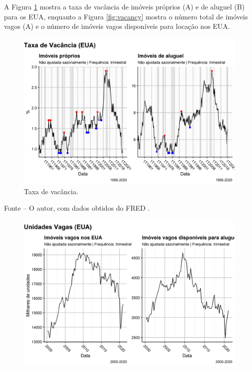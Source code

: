 \documentclass[
	12pt,				%
	oneside,			%
	a4paper,			%
	chapter=TITLE,		%
	section=TITLE,		%
	english,			%
	brazil				%
	]{abntex2}
\newcommand{\bcenter}{\begin{center}}
\newcommand{\ecenter}{\end{center}}
\begin{document}
\begin{refsection}
A Figura \ref{fig:vacancyRate} mostra a taxa de vacância de imóveis próprios (A)
e de aluguel (B) para os \gls{EUA}, enquanto a Figura \ref{fig:vacancy} mostra
o número total de imóveis vagos (A) e o número de imóveis vagos disponíveis para
locação nos EUA.
\begin{figure}[H]

{\centering \includegraphics[width=1\linewidth]{images/vacancyRate-1} 

}

\caption{Taxa de vacância.}\label{fig:vacancyRate}
\end{figure}
\bcenter

\small Fonte -- O autor, com dados obtidos do FRED \autocite{RHVRUSQ156N,RRVRUSQ156N}.
\ecenter
\begin{figure}[H]

{\centering \includegraphics[width=1\linewidth]{images/vacancy-1} 

}
\end{figure}
\end{refsection}
\end{document}
